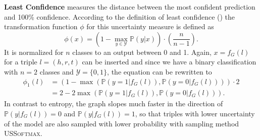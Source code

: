 \textbf{Least Confidence} 
measures the distance between the most confident prediction and 100\% confidence.
According to the definition of least confidence () the transformation function $\phi$ for this uncertainty measure is defined as
\begin{equation}
    \phi(x) = (1 - \max_{y \in \mathcal{Y}}{\mathds{P}(y | x)}) \cdot \left(\frac{n}{n-1}\right).
\end{equation}
It is normalized for $n$ classes to an output between 0 and 1.
Again, $x = f_G(l)$ for a triple $l = (h,r,t)$ can be inserted and since we have a binary classification with $n = 2$ classes and $\mathcal{Y} = \{0,1\}$, the equation can be rewritten to
\begin{equation} \label{eq:leastconfidence}
\begin{split}
\phi_1(l) 
& = (1 - \max({\mathds{P}(y = 1| f_G(l)), \mathds{P}(y = 0| f_G(l))})) \cdot 2 \\
&= 2 - 2 \max({\mathds{P}(y = 1| f_G(l)), \mathds{P}(y = 0| f_G(l))}).
\end{split}
\end{equation}
In contrast to entropy, the graph slopes much faster in the direction of $\mathds{P}(y | f_G(l)) = 0$ and $\mathds{P}(y | f_G(l)) = 1$, so that triples with lower uncertainty of the model are also sampled with lower probability with sampling method \textsc{USSoftmax}.
\clearpage

